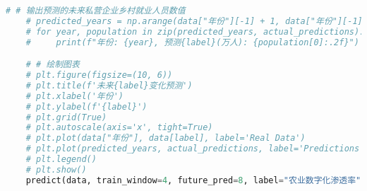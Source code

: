 \begin{lstlisting}[language=python,caption={数字农业渗透}]
    # # 输出预测的未来私营企业乡村就业人员数值
    # predicted_years = np.arange(data["年份"][-1] + 1, data["年份"][-1] + 1 + future_pred)
    # for year, population in zip(predicted_years, actual_predictions):
    #     print(f"年份: {year}, 预测{label}(万人): {population[0]:.2f}")

    # # 绘制图表
    # plt.figure(figsize=(10, 6))
    # plt.title(f'未来{label}变化预测')
    # plt.xlabel('年份')
    # plt.ylabel(f'{label}')
    # plt.grid(True)
    # plt.autoscale(axis='x', tight=True)
    # plt.plot(data["年份"], data[label], label='Real Data')
    # plt.plot(predicted_years, actual_predictions, label='Predictions', linestyle='--')
    # plt.legend()
    # plt.show()
    predict(data, train_window=4, future_pred=8, label="农业数字化渗透率",epochs=100,lr=0.0004)

\end{lstlisting}
